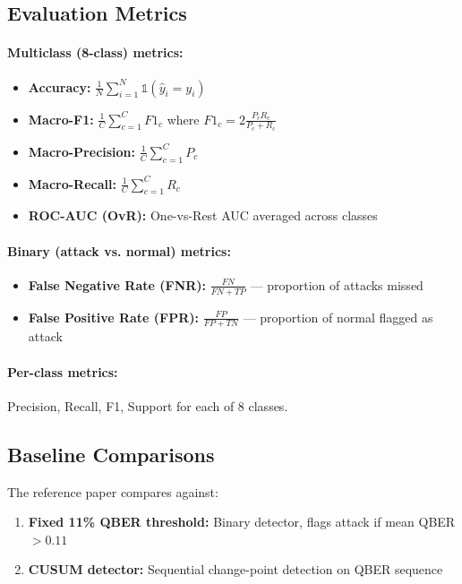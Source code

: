 \subsection{Evaluation Metrics}
\label{sec:metrics}

\paragraph{Multiclass (8-class) metrics:}
\begin{itemize}
    \item \textbf{Accuracy:} $\frac{1}{N}\sum_{i=1}^N \mathbb{1}(\hat{y}_i = y_i)$
    \item \textbf{Macro-F1:} $\frac{1}{C}\sum_{c=1}^C F1_c$ where $F1_c = 2\frac{P_c R_c}{P_c + R_c}$
    \item \textbf{Macro-Precision:} $\frac{1}{C}\sum_{c=1}^C P_c$
    \item \textbf{Macro-Recall:} $\frac{1}{C}\sum_{c=1}^C R_c$
    \item \textbf{ROC-AUC (OvR):} One-vs-Rest AUC averaged across classes
\end{itemize}

\paragraph{Binary (attack vs. normal) metrics:}
\begin{itemize}
    \item \textbf{False Negative Rate (FNR):} $\frac{FN}{FN + TP}$ --- proportion of attacks missed
    \item \textbf{False Positive Rate (FPR):} $\frac{FP}{FP + TN}$ --- proportion of normal flagged as attack
\end{itemize}

\paragraph{Per-class metrics:} Precision, Recall, F1, Support for each of 8 classes.

\subsection{Baseline Comparisons}
The reference paper compares against:
\begin{enumerate}
    \item \textbf{Fixed 11\% QBER threshold:} Binary detector, flags attack if mean QBER $> 0.11$
    \item \textbf{CUSUM detector:} Sequential change-point detection on QBER sequence
\end{enumerate}

